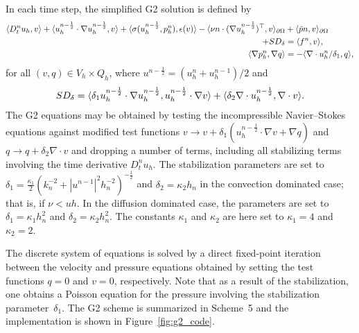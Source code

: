 In each time step, the simplified G2 solution is defined by
\begin{equation}
  \begin{split}
    \renni{v}{D_t^n u_h}
    + \renni{v}{u_h^{n-\frac{1}{2}} \cdot \nabla u_h^{n-\frac{1}{2}}}
    + \renni{\epsilon(v)}{\sigma(u_h^{n-\frac{1}{2}}, p_h^n)}
    - \renni{v}{\nu n \cdot (\nabla u_h^{n-\frac{1}{2}})^{\top}}_{\partial\Omega}
    &+ \renni{v}{\bar{p} n}_{\partial\Omega} \\
    + SD_{\delta}
    &= \renni{v}{f^n}, \\
    \renni{\nabla q}{\nabla p_h^n} &= - \renni{q}{\nabla \cdot u_h^n/\delta_1},
  \end{split}
\end{equation}
for all $(v, q) \in V_h \times Q_h$, where $u^{n-\frac{1}{2}} =
({u}^{n}_h + {u}^{n-1}_h) / 2$ and
\begin{equation}
  SD_{\delta}
  = \renni{u_h^{n-\frac{1}{2}} \cdot \nabla v}{\delta_1 u_h^{n-\frac{1}{2}} \cdot \nabla u_h^{n-\frac{1}{2}}}
  + \renni{\nabla \cdot v}{\delta_2 \nabla \cdot u_h^{n-\frac{1}{2}}}.
\end{equation}
The G2 equations may be obtained by testing the incompressible
Navier--Stokes equations against modified test functions $v
\rightarrow v + \delta_1 (u_h^{n-\frac{1}{2}} \cdot \nabla v + \nabla q)$ and
$q \rightarrow q + \delta_2 \nabla \cdot v$ and dropping a number of
terms, including all stabilizing terms involving the time derivative
$D_t^n u_h$. The stabilization parameters are set to $\delta_{1} =
\frac{\kappa_1}{2}(k_{n}^{-2} +
|u^{n-1}|^{2}h_{n}^{-2})^{-\frac{1}{2}}$ and $\delta_{2}= \kappa_2
h_n$ in the convection dominated case; that is, if $\nu < uh$. In the
diffusion dominated case, the parameters are set to $\delta_{1} =
\kappa_1 h_{n}^2$ and $\delta_{2} = \kappa_2 h_{n}^2$. The constants
$\kappa_1$ and $\kappa_2$ are here set to $\kappa_1 = 4$ and $\kappa_2
= 2$.

The discrete system of equations is solved by a direct fixed-point
iteration between the velocity and pressure equations obtained by
setting the test functions $q = 0$ and $v = 0$, respectively. Note that
as a result of the stabilization, one obtains a Poisson equation for
the pressure involving the stabilization parameter~$\delta_1$. The G2
scheme is summarized in Scheme~5 and the implementation is shown in
Figure~\ref{fig:g2_code}.

